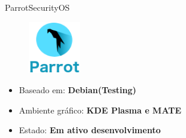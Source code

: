 \documentclass{beamer}
\begin{document}
\begin{frame}{ParrotSecurityOS}

\begin{figure}[h]
    \includegraphics[width=0.2\textwidth]{distros/parrot.png}
    \centering
\end{figure}
    
\begin{itemize}
    \item Baseado em: \textbf{Debian(Testing)}
    \item Ambiente gráfico: \textbf{KDE Plasma e MATE}
    \item Estado: \textbf{Em ativo desenvolvimento}
\end{itemize}
    
\end{frame}
\end{document}
